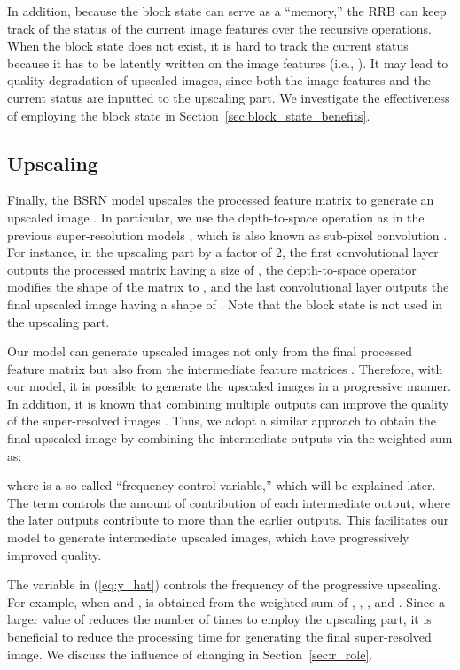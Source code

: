 \documentclass[runningheads]{llncs}
\begin{document}
In addition, because the block state can serve as a ``memory,'' the RRB can keep track of the status of the current image features over the recursive operations.
When the block state does not exist, it is hard to track the current status because it has to be latently written on the image features (i.e., ).
It may lead to quality degradation of upscaled images, since both the image features and the current status are inputted to the upscaling part.
We investigate the effectiveness of employing the block state in Section~\ref{sec:block_state_benefits}.


\subsection{Upscaling}

Finally, the BSRN model upscales the processed feature matrix  to generate an upscaled image .
In particular, we use the depth-to-space operation as in the previous super-resolution models \cite{ahn2018fast,choi2017deep}, which is also known as sub-pixel convolution \cite{shi2016real}.
For instance, in the upscaling part by a factor of 2, the first convolutional layer outputs the processed matrix having a size of , the depth-to-space operator modifies the shape of the matrix to , and the last convolutional layer outputs the final upscaled image having a shape of .
Note that the block state  is not used in the upscaling part.

Our model can generate upscaled images not only from the final processed feature matrix  but also from the intermediate feature matrices .
Therefore, with our model, it is possible to generate the upscaled images in a progressive manner.
In addition, it is known that combining multiple outputs can improve the quality of the super-resolved images \cite{han2018image,kim2016deeply}.
Thus, we adopt a similar approach to obtain the final upscaled image  by combining the intermediate outputs via the weighted sum as:

where  is a so-called ``frequency control variable,'' which will be explained later.
The term  controls the amount of contribution of each intermediate output, where the later outputs contribute to  more than the earlier outputs.
This facilitates our model to generate intermediate upscaled images, which have progressively improved quality.

The variable  in (\ref{eq:y_hat}) controls the frequency of the progressive upscaling.
For example, when  and ,  is obtained from the weighted sum of , , , and .
Since a larger value of  reduces the number of times to employ the upscaling part, it is beneficial to reduce the processing time for generating the final super-resolved image.
We discuss the influence of changing  in Section~\ref{sec:r_role}.
\end{document}
